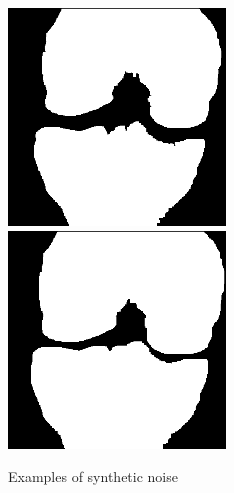 \begin{figure}[H]
\endminipage\hfill
{}%
  \includegraphics[width=\linewidth]{imgs/orig_seg2.png}
\endminipage\hfill
{}%
  \includegraphics[width=\linewidth]{imgs/noisy_seg2.png}
\endminipage
\caption{Examples of synthetic noise}
\end{figure}

